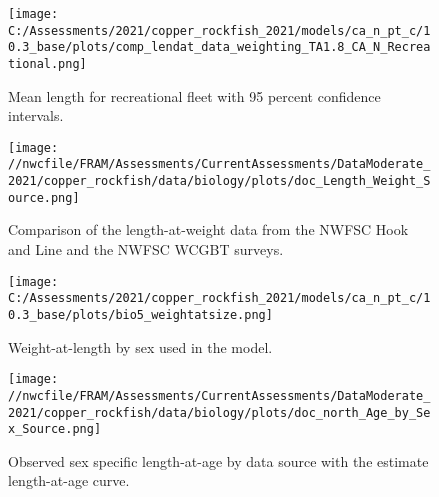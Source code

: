 \documentclass[11pt,
  english,
  a4paper,
]{article}
\begin{document}
\begin{figure}
\centering
\texttt{[image: C:/Assessments/2021/copper\_rockfish\_2021/models/ca\_n\_pt\_c/10.3\_base/plots/comp\_lendat\_data\_weighting\_TA1.8\_CA\_N\_Recreational.png]}
\caption{Mean length for recreational fleet with 95 percent confidence intervals.\label{fig:mean-rec-len-data}}
\end{figure}

\tagmcend\tagstructend


\begin{figure}
\centering
\texttt{[image: //nwcfile/FRAM/Assessments/CurrentAssessments/DataModerate\_2021/copper\_rockfish/data/biology/plots/doc\_Length\_Weight\_Source.png]}
\caption{Comparison of the length-at-weight data from the NWFSC Hook and Line and the NWFSC WCGBT surveys.\label{fig:len-weight-survey}}
\end{figure}

\tagmcend\tagstructend


\begin{figure}
\centering
\texttt{[image: C:/Assessments/2021/copper\_rockfish\_2021/models/ca\_n\_pt\_c/10.3\_base/plots/bio5\_weightatsize.png]}
\caption{Weight-at-length by sex used in the model.\label{fig:len-weight}}
\end{figure}

\tagmcend\tagstructend


\begin{figure}
\centering
\texttt{[image: //nwcfile/FRAM/Assessments/CurrentAssessments/DataModerate\_2021/copper\_rockfish/data/biology/plots/doc\_north\_Age\_by\_Sex\_Source.png]}
\caption{Observed sex specific length-at-age by data source with the estimate length-at-age curve.\label{fig:len-age-data}}
\end{figure}

\tagmcend\tagstructend

\end{document}
